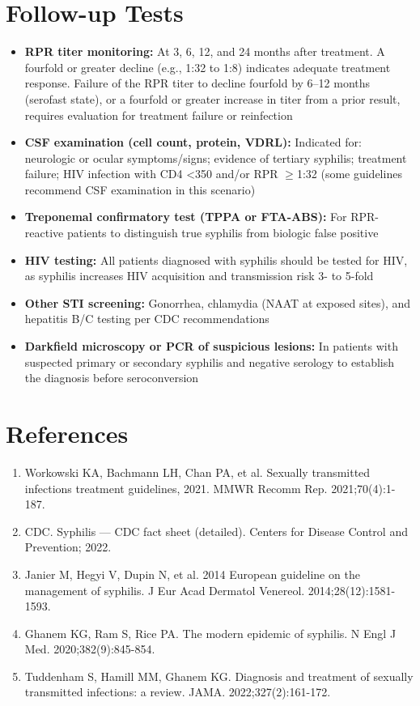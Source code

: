 \section*{Follow-up Tests}
\begin{itemize}
  \item \textbf{RPR titer monitoring:} At 3, 6, 12, and 24 months after treatment. A fourfold or greater decline (e.g., 1:32 to 1:8) indicates adequate treatment response. Failure of the RPR titer to decline fourfold by 6--12 months (serofast state), or a fourfold or greater increase in titer from a prior result, requires evaluation for treatment failure or reinfection
  \item \textbf{CSF examination (cell count, protein, VDRL):} Indicated for: neurologic or ocular symptoms/signs; evidence of tertiary syphilis; treatment failure; HIV infection with CD4 <350 and/or RPR $\geq$1:32 (some guidelines recommend CSF examination in this scenario)
  \item \textbf{Treponemal confirmatory test (TPPA or FTA-ABS):} For RPR-reactive patients to distinguish true syphilis from biologic false positive
  \item \textbf{HIV testing:} All patients diagnosed with syphilis should be tested for HIV, as syphilis increases HIV acquisition and transmission risk 3- to 5-fold
  \item \textbf{Other STI screening:} Gonorrhea, chlamydia (NAAT at exposed sites), and hepatitis B/C testing per CDC recommendations
  \item \textbf{Darkfield microscopy or PCR of suspicious lesions:} In patients with suspected primary or secondary syphilis and negative serology to establish the diagnosis before seroconversion
\end{itemize}

\section*{References}
\begin{enumerate}
  \item Workowski KA, Bachmann LH, Chan PA, et al. Sexually transmitted infections treatment guidelines, 2021. MMWR Recomm Rep. 2021;70(4):1-187.
  \item CDC. Syphilis --- CDC fact sheet (detailed). Centers for Disease Control and Prevention; 2022.
  \item Janier M, Hegyi V, Dupin N, et al. 2014 European guideline on the management of syphilis. J Eur Acad Dermatol Venereol. 2014;28(12):1581-1593.
  \item Ghanem KG, Ram S, Rice PA. The modern epidemic of syphilis. N Engl J Med. 2020;382(9):845-854.
  \item Tuddenham S, Hamill MM, Ghanem KG. Diagnosis and treatment of sexually transmitted infections: a review. JAMA. 2022;327(2):161-172.
\end{enumerate}

\clearpage
